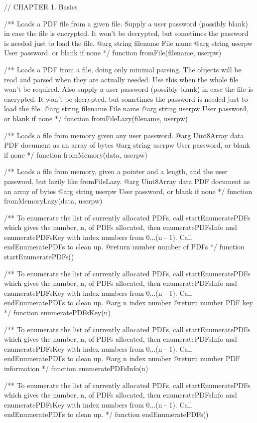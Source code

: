 // CHAPTER 1. Basics

/** Loads a PDF file from a given file. Supply a user password (possibly blank)
in case the file is encrypted. It won't be decrypted, but sometimes the
password is needed just to load the file.
@arg {string} filename File name
@arg {string} userpw User password, or blank if none */
function fromFile(filename, userpw) {}

/** Loads a PDF from a file, doing only minimal parsing. The objects will be
read and parsed when they are actually needed. Use this when the whole file
won't be required. Also supply a user password (possibly blank) in case the
file is encrypted. It won't be decrypted, but sometimes the password is needed
just to load the file.
@arg {string} filename File name
@arg {string} userpw User password, or blank if none */
function fromFileLazy(filename, userpw) {}

/** Loads a file from memory given any user password.
@arg {Uint8Array} data PDF document as an array of bytes
@arg {string} userpw User password, or blank if none */
function fromMemory(data, userpw) {}

/** Loads a file from memory, given a pointer and a length, and the user
password, but lazily like fromFileLazy.
@arg {Uint8Array} data PDF document as an array of bytes
@arg {string} userpw User password, or blank if none */
function fromMemoryLazy(data, userpw) {}

/** To enumerate the list of currently allocated PDFs, call startEnumeratePDFs
which gives the number, n, of PDFs allocated, then enumeratePDFsInfo and
enumeratePDFsKey with index numbers from 0...(n - 1). Call endEnumeratePDFs to
clean up.
@return {number} number of PDFs */
function startEnumeratePDFs() {}

/** To enumerate the list of currently allocated PDFs, call startEnumeratePDFs
which gives the number, n, of PDFs allocated, then enumeratePDFsInfo and
enumeratePDFsKey with index numbers from 0...(n - 1). Call endEnumeratePDFs to
clean up.
@arg {n} index number
@return {number} PDF key */
function enumeratePDFsKey(n) {}

/** To enumerate the list of currently allocated PDFs, call startEnumeratePDFs
which gives the number, n, of PDFs allocated, then enumeratePDFsInfo and
enumeratePDFsKey with index numbers from 0...(n - 1). Call endEnumeratePDFs to
clean up.
@arg {n} index number
@return {number} PDF information */
function enumeratePDFsInfo(n) {}

/** To enumerate the list of currently allocated PDFs, call startEnumeratePDFs
which gives the number, n, of PDFs allocated, then enumeratePDFsInfo and
enumeratePDFsKey with index numbers from 0...(n - 1). Call endEnumeratePDFs to
clean up. */
function endEnumeratePDFs() {}

